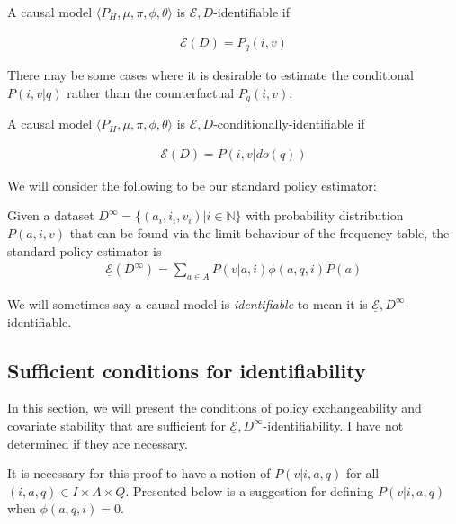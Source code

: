 \begin{definition}
A causal model $\langle P_H, \mu,\pi,\phi,\theta\rangle$ is $\mathscr{E},D$-identifiable if 

\begin{align}
    \mathscr{E}(D)=P_q(i,v)
\end{align}
\end{definition}

There may be some cases where it is desirable to estimate the conditional $P(i,v|q)$ rather than the counterfactual $P_q(i,v)$.

\begin{definition}
A causal model $\langle P_H, \mu,\pi,\phi,\theta\rangle$ is $\mathscr{E},D$-conditionally-identifiable if 

\begin{align}
    \mathscr{E}(D)=P(i,v|do(q))
\end{align}
\end{definition}

We will consider the following to be our standard policy estimator:

\begin{definition}
Given a dataset $D^\infty=\{(a_i,i_i,v_i)|i\in\mathbb{N}\}$ with probability distribution $P(a,i,v)$ that can be found via the limit behaviour of the frequency table, the standard policy estimator is
\begin{align}
    \underline{\mathscr{E}}(D^\infty) = \sum_{a\in A} P(v|a,i) \phi(a,q,i) P(a)
\end{align}
\end{definition}

We will sometimes say a causal model is \emph{identifiable} to mean it is $\underline{\mathscr{E}}, D^\infty$-identifiable.

\subsection{Sufficient conditions for identifiability}

In this section, we will present the conditions of policy exchangeability and covariate stability that are sufficient for $\underline{\mathscr{E}}, D^\infty$-identifiability. I have not determined if they are necessary.

It is necessary for this proof to have a notion of $P(v|i,a,q)$ for all $(i,a,q)\in I\times A\times Q$. Presented below is a suggestion for defining $P(v|i,a,q)$ when $\phi(a,q,i)=0$. 

